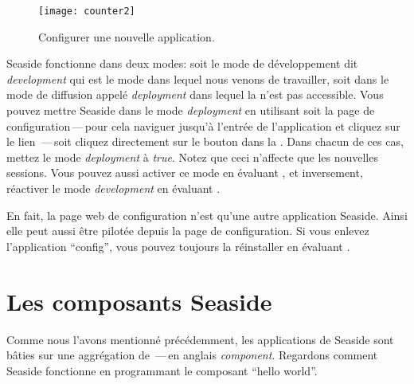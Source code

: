 \documentclass[a4paper,10pt,twoside]{book}
\begin{document}
\begin{figure}[ht]
\begin{center}
\texttt{[image: counter2]}
\caption{Configurer une nouvelle application.}
\end{center}
\end{figure}

Seaside fonctionne dans deux modes: soit le mode de développement dit 
\emph{development} qui est le mode dans lequel nous venons de travailler,
soit dans le mode de diffusion appelé \emph{deployment} dans lequel la
\toolbar n'est pas accessible. 
Vous pouvez mettre Seaside dans le mode \emph{deployment} en utilisant
soit la page de configuration\,---\,pour cela naviguer jusqu'à
l'entrée de l'application et cliquez sur le lien \,---\,soit
cliquez directement sur le bouton   dans la
\toolbar.
Dans chacun de ces cas, mettez le mode \emph{deployment} à
\emph{true}.
Notez que ceci n'affecte que les nouvelles sessions.
Vous pouvez aussi activer ce mode en évaluant 
 , et
inversement, réactiver le mode \emph{development} en évaluant
.

En fait, la page web de configuration n'est qu'une autre application
Seaside. Ainsi elle peut aussi être pilotée depuis la page de
configuration. Si vous enlevez l'application
``config'', vous pouvez toujours la réinstaller en évaluant
 .

\section{Les composants Seaside}


Comme nous l'avons mentionné précédemment, les applications de Seaside sont bâties sur une aggrégation de
  \,---\,en anglais \emph{component}.
Regardons comment Seaside fonctionne en programmant le composant
``hello world''.
\end{document}
